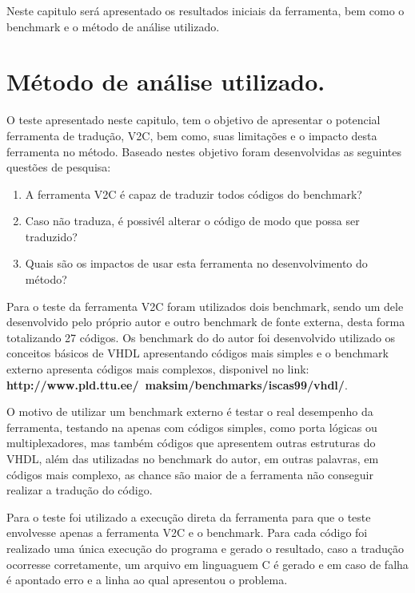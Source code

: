 \label{chapter:resultados}
\par
Neste capitulo será apresentado os resultados iniciais da ferramenta, bem como o benchmark e o método de análise utilizado.

\section{Método de análise utilizado.}
O teste apresentado neste capitulo, tem o objetivo de apresentar o potencial ferramenta de tradução, V2C, bem como, suas limitações e o impacto desta ferramenta no método. Baseado nestes objetivo foram desenvolvidas as seguintes questões de pesquisa:
\begin{enumerate}
    \item A ferramenta V2C é capaz de traduzir todos códigos do benchmark?
    \item Caso não traduza, é possivél alterar o código de modo que possa ser traduzido?
    \item Quais são os impactos de usar esta ferramenta no desenvolvimento do método?
\end{enumerate}
\par
Para o teste da ferramenta V2C foram utilizados dois benchmark, sendo um dele desenvolvido pelo próprio autor e outro benchmark de fonte externa, desta forma totalizando 27 códigos. Os benchmark do do autor foi desenvolvido utilizado os conceitos básicos de VHDL apresentando códigos mais simples e o benchmark externo apresenta códigos mais complexos, disponivel no link: \textbf{http://www.pld.ttu.ee/~maksim/benchmarks/iscas99/vhdl/}.

\par
O motivo de utilizar um benchmark externo é testar o real desempenho da ferramenta, testando na apenas com códigos simples, como porta lógicas ou multiplexadores, mas também códigos que apresentem outras estruturas do VHDL, além das utilizadas no benchmark do autor, em outras palavras, em códigos mais complexo, as chance são maior de a ferramenta não conseguir realizar a tradução do código.

\par
Para o teste foi utilizado a execução direta da ferramenta para que o teste envolvesse apenas a ferramenta V2C e o benchmark. Para cada código foi realizado uma única execução do programa e gerado o resultado, caso a tradução ocorresse corretamente, um arquivo em linguaguem C é gerado e em caso de falha é apontado erro e a linha ao qual apresentou o problema. 

